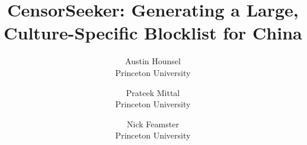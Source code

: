 \documentclass[twocolumn,10pt]{confpaper}
\begin{document}

\title{\fontsize{14}{14} \textbf{CensorSeeker: Generating a Large, \\ Culture-Specific Blocklist for China}}
\date{}
\author{
{\rm Austin Hounsel}\\
Princeton University
\and
{\rm Prateek Mittal}\\
Princeton University
\and
{\rm Nick Feamster}\\
Princeton University
} %

\posttitle{\par\end{center}}
\setlength{\droptitle}{-10pt}
\maketitle

\thispagestyle{empty}










\end{document}

